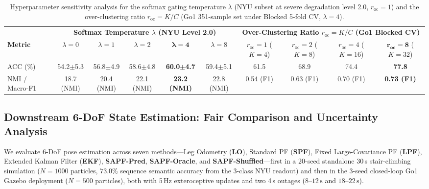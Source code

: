 \documentclass[11pt, a4paper]{article}
\begin{document}
\begin{table}[htbp]
    \centering
    \caption{Hyperparameter sensitivity analysis for the softmax gating temperature $\lambda$ (NYU subset at severe degradation level 2.0, $r_{\text{oc}}=1$) and the over-clustering ratio $r_{\text{oc}} = K/C$ (Go1 351-sample set under Blocked 5-fold CV, $\lambda=4$).}
    \label{tab:sensitivity}
    \footnotesize
    \setlength{\tabcolsep}{4pt}
    \begin{tabular}{lccccc|cccc}
        \toprule
        & \multicolumn{5}{c|}{\textbf{Softmax Temperature $\lambda$ (NYU Level 2.0)}} & \multicolumn{4}{c}{\textbf{Over-Clustering Ratio $r_{\text{oc}} = K/C$ (Go1 Blocked CV)}} \\
        \textbf{Metric} & $\lambda=0$ & $\lambda=1$ & $\lambda=2$ & $\mathbf{\lambda=4}$ & $\lambda=8$ & $r_{\text{oc}}=1$ ($K=4$) & $r_{\text{oc}}=2$ ($K=8$) & $r_{\text{oc}}=4$ ($K=16$) & $\mathbf{r_{\text{oc}}=8}$ ($K=32$) \\
        \midrule
        ACC (\%) & 54.2$\pm$5.3 & 56.8$\pm$4.9 & 58.6$\pm$4.8 & \textbf{60.0$\pm$4.7} & 59.4$\pm$5.1 & 61.5 & 68.9 & 74.4 & \textbf{77.8} \\
        NMI / Macro-F1 & 18.7 (NMI) & 20.4 (NMI) & 22.1 (NMI) & \textbf{23.2 (NMI)} & 22.8 (NMI) & 0.54 (F1) & 0.63 (F1) & 0.70 (F1) & \textbf{0.73 (F1)} \\
        \bottomrule
    \end{tabular}
\end{table}

\subsection{Downstream 6-DoF State Estimation: Fair Comparison and Uncertainty Analysis}
\label{subsec:sapf_exp}
We evaluate 6-DoF pose estimation across seven methods—Leg Odometry (\textbf{LO}), Standard PF (\textbf{SPF}), Fixed Large-Covariance PF (\textbf{LPF}), Extended Kalman Filter (\textbf{EKF}), \textbf{SAPF-Pred}, \textbf{SAPF-Oracle}, and \textbf{SAPF-Shuffled}—first in a 20-seed standalone 30\,s stair-climbing simulation ($N=1000$ particles, $73.0\%$ sequence semantic accuracy from the 3-class NYU readout) and then in the 3-seed closed-loop Go1 Gazebo deployment ($N=500$ particles), both with 5\,Hz exteroceptive updates and two 4\,s outages ($8$--$12\,\text{s}$ and $18$--$22\,\text{s}$).
\end{document}
